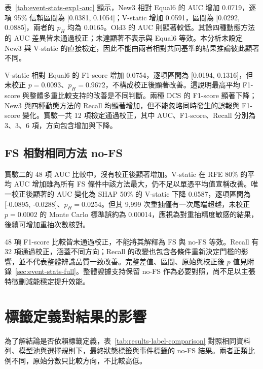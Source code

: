 

表~\ref{tab:event-stats-exp1-auc} 顯示，New3 相對 Equal6 的 AUC 增加 0.0719，逐項 95\% 信賴區間為 [0.0381, 0.1054]；V-static 增加 0.0591，區間為 [0.0292, 0.0885]，兩者的 \(p_H\) 均為 0.0165。Old3 的 AUC 則顯著較低。其餘四種動態方法的 AUC 差異皆未通過校正；未達顯著不表示與 Equal6 等效。本分析未設定 New3 與 V-static 的直接檢定，因此不能由兩者相對共同基準的結果推論彼此顯著不同。

V-static 相對 Equal6 的 F1-score 增加 0.0754，逐項區間為 [0.0194, 0.1316]，但未校正 \(p=0.0093\)、\(p_H=0.9672\)，不構成校正後顯著改善。這說明最高平均 F1-score 與整體多重比較支持的改善是不同判斷。兩種 DCS 的 F1-score 顯著下降；New3 與四種動態方法的 Recall 均顯著增加，但不能忽略同時發生的誤報與 F1-score 變化。實驗一共 12 項檢定通過校正，其中 AUC、F1-score、Recall 分別為 3、3、6 項，方向包含增加與下降。

\subsection{FS 相對相同方法 no-FS}

實驗二的 48 項 AUC 比較中，沒有校正後顯著增加。V-static 在 RFE 80\% 的平均 AUC 增加雖為所有 FS 條件中該方法最大，仍不足以單憑平均值宣稱改善。唯一校正後顯著的 AUC 變化為 SHAP 50\% 的 V-static 下降 0.0587，逐項區間為 [-0.0895, -0.0288]、\(p_H=0.0254\)。但其 9,999 次重抽僅有一次尾端超越，未校正 \(p=0.0002\) 的 Monte Carlo 標準誤約為 0.00014，應視為對重抽精度敏感的結果，後續可增加重抽次數核對。

48 項 F1-score 比較皆未通過校正，不能將其解釋為 FS 與 no-FS 等效。Recall 有 32 項通過校正，涵蓋不同方向；Recall 的改變也包含各條件重新決定門檻的影響，並不代表整體辨識品質一致改善。完整差值、區間、原始與校正後 \(p\) 值見附錄~\ref{sec:event-stats-full}。整體證據支持保留 no-FS 作為必要對照，尚不足以主張特徵刪減能穩定提升效能。

\section{標籤定義對結果的影響}\label{sec:results-label}

為了解結論是否依賴標籤定義，表~\ref{tab:results-label-comparison} 對照相同資料列、模型池與選擇規則下，最終狀態標籤與事件標籤的 no-FS 結果。兩者正類比例不同，原始分數只比較方向，不比較高低。



